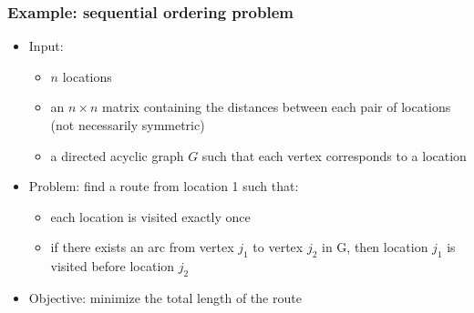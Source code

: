 \documentclass[10pt]{beamer}
\begin{document}
\begin{frame}
  \frametitle{Example: sequential ordering problem}

  \begin{itemize}
    \item Input:
      \begin{itemize}
        \item $n$ locations
        \item an $n \times n$ matrix containing the distances between each pair of locations (not necessarily symmetric)
        \item a directed acyclic graph $G$ such that each vertex corresponds to a location
      \end{itemize}
    \item Problem: find a route from location 1 such that:
      \begin{itemize}
        \item each location is visited exactly once
        \item if there exists an arc from vertex $j_1$ to vertex $j_2$ in G, then location $j_1$ is visited before location $j_2$
      \end{itemize}
    \item Objective: minimize the total length of the route
  \end{itemize}
\end{frame}
\end{document}
